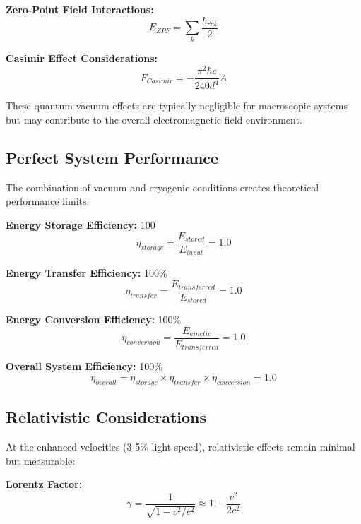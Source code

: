 \documentclass[12pt,a4paper]{article}
\begin{document}
\textbf{Zero-Point Field Interactions:}
\begin{equation}
E_{ZPF} = \sum_k \frac{\hbar \omega_k}{2}
\end{equation}

\textbf{Casimir Effect Considerations:}
\begin{equation}
F_{Casimir} = -\frac{\pi^2 \hbar c}{240 d^4} A
\end{equation}

These quantum vacuum effects are typically negligible for macroscopic systems but may contribute to the overall electromagnetic field environment.

\subsection{Perfect System Performance}

The combination of vacuum and cryogenic conditions creates theoretical performance limits:

\textbf{Energy Storage Efficiency:} 100%
\begin{equation}
\eta_{storage} = \frac{E_{stored}}{E_{input}} = 1.0
\end{equation}

\textbf{Energy Transfer Efficiency:} 100\%
\begin{equation}
\eta_{transfer} = \frac{E_{transferred}}{E_{stored}} = 1.0
\end{equation}

\textbf{Energy Conversion Efficiency:} 100\%
\begin{equation}
\eta_{conversion} = \frac{E_{kinetic}}{E_{transferred}} = 1.0
\end{equation}

\textbf{Overall System Efficiency:} 100\%
\begin{equation}
\eta_{overall} = \eta_{storage} \times \eta_{transfer} \times \eta_{conversion} = 1.0
\end{equation}

\subsection{Relativistic Considerations}

At the enhanced velocities (3-5\% light speed), relativistic effects remain minimal but measurable:

\textbf{Lorentz Factor:}
\begin{equation}
\gamma = \frac{1}{\sqrt{1-v^2/c^2}} \approx 1 + \frac{v^2}{2c^2}
\end{equation}
\end{document}
